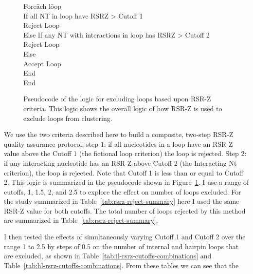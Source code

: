 \begin{figure}
  \begin{tabbing}
  Fore\=ach l\=oop \\
    \>If all NT in loop have RSRZ \textgreater{} Cutoff 1 \\
      \>\>Reject Loop \\
    \>Else If any NT with interactions in loop has RSRZ \textgreater{} Cutoff 2 \\
      \>\>Reject Loop \\
    \>Else \\
      \>\>Accept Loop \\
    \>End \\
  End \\
  \end{tabbing}
  \caption{Pseudocode of the logic for excluding loops based upon RSR-Z
  criteria. This logic shows the overall logic of how RSR-Z is used to exclude
  loops from clustering.}
  \label{fig:pseudo-rsrz-logic}
\end{figure}

We use the two criteria described here to build a composite, two-step RSR-Z
quality assurance protocol; step 1: if all nucleotides in a loop have an RSR-Z
value above the Cutoff 1 (the fictional loop criterion) the loop is rejected.
Step 2: if any interacting nucleotide has an RSR-Z above Cutoff 2 (the
Interacting Nt criterion), the loop is rejected. Note that Cutoff 1 is less than
or equal to Cutoff 2. This logic is summarized in the pseudocode shown in
Figure~\ref{fig:pseudo-rsrz-logic}. I use a range of cutoffs, 1, 1.5, 2, and 2.5
to explore the effect on number of loops excluded. For the study summarized in
Table~\ref{tab:rsrz-reject-summary} here I used the same RSR-Z value for both
cutoffs. The total number of loops rejected by this method are summarized in
Table~\ref{tab:rsrz-reject-summary}. 


I then tested the effects of simultaneously varying Cutoff 1 and Cutoff 2 over
the range 1 to 2.5 by steps of 0.5 on the number of internal and hairpin loops
that are excluded, as shown in Table~\ref{tab:il-rsrz-cutoffs-combinations} and
Table~\ref{tab:hl-rsrz-cutoffs-combinations}. From these tables we can see that
the

